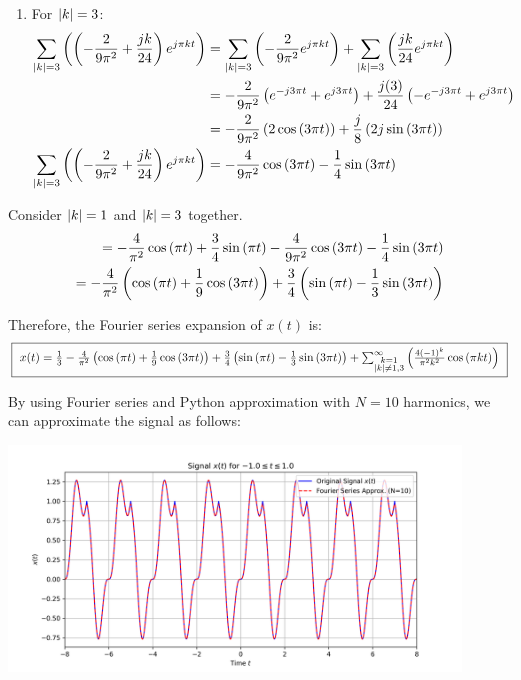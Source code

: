 \documentclass[a4paper, 10pt]{article}
\begin{document}
\begin{tosubmit}
\begin{enumerate}
    \item For \( \left| k \right| = 3 \):
    \begin{align*}
        \sum_{\left| k \right| = 3} \left( \left( -\frac{2}{9\pi^2} + \frac{jk}{24} \right) e^{ j \pi k t}\right) &= \sum_{\left| k \right| = 3} \left( -\frac{2}{9\pi^2} e^{ j \pi k t} \right) + \sum_{\left| k \right| = 3} \left( \frac{jk}{24} e^{ j \pi k t} \right) \\
        &= -\frac{2}{9\pi^2} \left( e^{-j 3\pi t} + e^{j 3\pi t} \right) + \frac{j(3)}{24} \left( -e^{-j 3\pi t} + e^{j 3\pi t} \right) \\
        &= -\frac{2}{9\pi^2} \left( 2\cos{(3\pi t)} \right) + \frac{j}{8} \left( 2j\sin{(3\pi t)} \right) \\
        \sum_{\left| k \right| = 3} \left( \left( -\frac{2}{9\pi^2} + \frac{jk}{24} \right) e^{ j \pi k t}\right) &= -\frac{4}{9\pi^2} \cos{(3\pi t)} - \frac{1}{4} \sin{(3\pi t)}
    \end{align*}
\end{enumerate}

\newpage

Consider \( \left|k\right| = 1 \) and \( \left|k\right| = 3 \) together.
\begin{align*}
    = - \frac{4}{\pi^2} \cos{(\pi t)} + \frac{3}{4} \sin{(\pi t)} - \frac{4}{9\pi^2} \cos{(3\pi t)} - \frac{1}{4} \sin{(3\pi t)} \\
    = - \frac{4}{\pi^2} \left( \cos{(\pi t)} + \frac{1}{9} \cos{(3\pi t)} \right) + \frac{3}{4} \left( \sin{(\pi t)} - \frac{1}{3} \sin{(3\pi t)} \right)
\end{align*}


Therefore, the Fourier series expansion of \( x(t) \) is:
\[ \boxed{ \scalebox{0.90}{ \(
x(t) = \frac{1}{3} - \frac{4}{\pi^2} \paren{ \cos{(\pi t)} + \frac{1}{9} \cos{(3\pi t)} } + \frac{3}{4} \paren{ \sin{(\pi t)} - \frac{1}{3} \sin{(3\pi t)} } + \sum_{\substack{ k = 1 \\ \abs{ k } \neq 1, 3 }}^{\infty} \paren{ \frac{4(-1)^{k}}{\pi^2 k^2} \cos{(\pi k t)} }
\) } } \]

By using Fourier series and Python approximation with \( N = 10 \) harmonics, we can approximate the signal as follows:
\begin{center}
    \includegraphics[width=0.9\textwidth]{images/problem_2_3.png}
\end{center}
\end{tosubmit}
\end{document}
